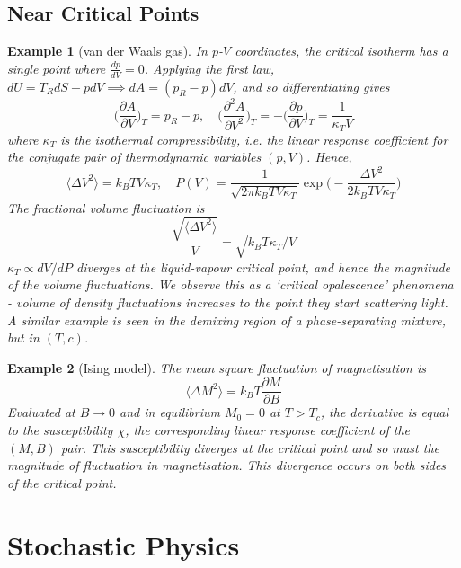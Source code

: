 \documentclass[a4paper]{article}
\newtheorem{eg}{Example}[section]
\theoremstyle{new}
\begin{document}
\subsection{Near Critical Points}
\begin{eg}[van der Waals gas]
In $p$-$V$ coordinates, the critical isotherm has a single point where $\frac{dp}{dV}=0$. Applying the first law, $dU=T_RdS-pdV\implies dA=(p_R-p)dV$, and so differentiating gives
$$\bigg(\frac{\partial A}{\partial V}\bigg)_T=p_R-p,\quad\bigg(\frac{\partial^2A}{\partial V^2}\bigg)_T=-\bigg(\frac{\partial p}{\partial V}\bigg)_T=\frac{1}{\kappa_TV}$$
where $\kappa_T$ is the isothermal compressibility, i.e. the linear response coefficient for the conjugate pair of thermodynamic variables $(p,V)$. Hence, 
$$\langle\Delta V^2\rangle=k_BTV\kappa_T,\quad P(V)=\frac{1}{\sqrt{2\pi k_BTV\kappa_T}}\exp\bigg(-\frac{\Delta V^2}{2k_BTV\kappa_T}\bigg)$$
The fractional volume fluctuation is
$$\frac{\sqrt{\langle\Delta V^2\rangle}}{V}=\sqrt{k_BT\kappa_T/V}$$
$\kappa_T\propto dV/dP$ diverges at the liquid-vapour critical point, and hence the magnitude of the volume fluctuations. We observe this as a `critical opalescence' phenomena - volume of density fluctuations increases to the point they start scattering light. A similar example is seen in the demixing region of a phase-separating mixture, but in $(T,c)$.
\end{eg}
\begin{eg}[Ising model]
The mean square fluctuation of magnetisation is
$$\langle\Delta M^2\rangle=k_BT\frac{\partial M}{\partial B}$$
Evaluated at $B\rightarrow 0$ and in equilibrium $M_0=0$ at $T>T_c$, the derivative is equal to the susceptibility $\chi$, the corresponding linear response coefficient of the $(M,B)$ pair. This susceptibility diverges at the critical point and so must the magnitude of fluctuation in magnetisation. This divergence occurs on both sides of the critical point.
\end{eg}
\newpage
\section{Stochastic Physics}
\end{document}
